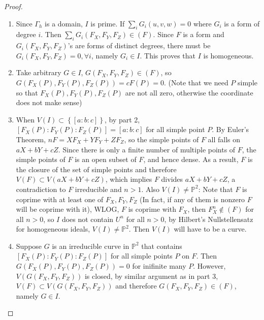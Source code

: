 \documentclass{solution}
\begin{document}
\begin{proof}
    \begin{enumerate}
        \item Since $\Gamma_h$ is a domain, $I$ is prime. If $\sum\limits_{i} G_i(u, v, w) = 0$ where $G_i$ is a form of degree $i$. Then $\sum\limits_{i} G_i(F_X, F_Y, F_Z) \in (F)$. Since $F$ is a form and $G_i(F_X, F_Y, F_Z)$'s are forms of distinct degrees, there must be $G_i(F_X, F_Y, F_Z) = 0, \forall i$, namely $G_i \in I$. This proves that $I$ is homogeneous.
        \item Take arbitrary $G \in I$, $G(F_X, F_Y, F_Z) \in (F)$, so $G(F_X(P), F_Y(P), F_Z(P)) = cF(P) = 0$. (Note that we need $P$ simple so that $F_X(P), F_Y(P), F_Z(P)$ are not all zero, otherwise the coordinate does not make sense)
        \item When $V(I) \subset \left\lbrace [a:b:c] \right\rbrace$, by part 2, $[F_X(P):F_Y(P):F_Z(P)] = [a:b:c]$ for all simple point $P$. By Euler's Theorem, $nF = XF_X + YF_Y + ZF_Z$, so the simple points of $F$ all falls on $aX + bY + cZ$. Since there is only a finite number of multiple points of $F$, the simple points of $F$ is an open subset of $F$, and hence dense. As a result, $F$ is the closure of the set of simple points and therefore $V(F) \subset V(aX + bY + cZ)$, which implies $F$ divides $aX + bY + cZ$, a contradiction to $F$ irreducible and $n \gt 1$. Also $V(I) \ne \mathbb{P}^2$: Note that $F$ is coprime with at least one of $F_X, F_Y, F_Z$ (In fact, if any of them is nonzero $F$ will be coprime with it), WLOG, $F$ is coprime with $F_X$, then $F_X^n \notin (F)$ for all $n \gt 0$, so $I$ does not contain $U^n$ for all $n \gt 0$, by Hilbert's Nullstellensatz for homogeneous ideals, $V(I) \ne \mathbb{P}^2$. Then $V(I)$ will have to be a curve.
        \item Suppose $G$ is an irreducible curve in $\mathbb{P}^2$ that contains $[F_X(P): F_Y(P): F_Z(P)]$ for all simple points $P$ on $F$. Then $G(F_X(P), F_Y(P), F_Z(P)) = 0$ for inifinite many $P$. However, $V(G(F_X, F_Y, F_Z))$ is closed, by similar argument as in part 3, $V(F) \subset V(G(F_X, F_Y, F_Z))$ and therefore $G(F_X, F_Y, F_Z) \in (F)$, namely $G \in I$.
    \end{enumerate}
\end{proof}
\end{document}
